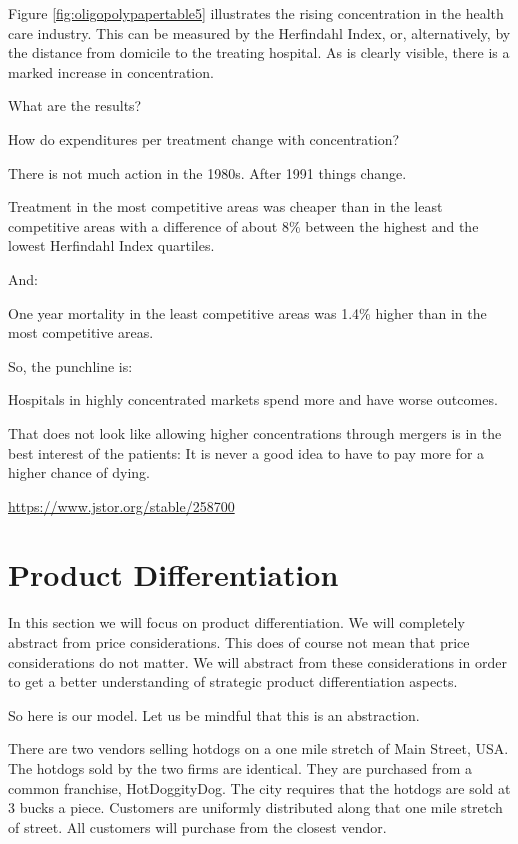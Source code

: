 \documentclass[
]{book}
\begin{document}
Figure \ref{fig:oligopolypapertable5} illustrates the rising concentration in the health care industry. This can be measured by the Herfindahl Index, or, alternatively, by the distance from domicile to the treating hospital. As is clearly visible, there is a marked increase in concentration.

What are the results?

How do expenditures per treatment change with concentration?

There is not much action in the 1980s. After 1991 things change.

Treatment in the most competitive areas was cheaper than in the least competitive areas with a difference of about 8\% between the highest and the lowest Herfindahl Index quartiles.

And:

One year mortality in the least competitive areas was 1.4\% higher than in the most competitive areas.

So, the punchline is:

Hospitals in highly concentrated markets spend more and have worse outcomes.

That does not look like allowing higher concentrations through mergers is in the best interest of the patients: It is never a good idea to have to pay more for a higher chance of dying.

\url{https://www.jstor.org/stable/258700}

\hypertarget{product-differentiation}{%
\section{Product Differentiation}\label{product-differentiation}}

In this section we will focus on product differentiation. We will completely abstract from price considerations. This does of course not mean that price considerations do not matter. We will abstract from these considerations in order to get a better understanding of strategic product differentiation aspects.

So here is our model. Let us be mindful that this is an abstraction.

There are two vendors selling hotdogs on a one mile stretch of Main Street, USA. The hotdogs sold by the two firms are identical. They are purchased from a common franchise, HotDoggityDog. The city requires that the hotdogs are sold at 3 bucks a piece. Customers are uniformly distributed along that one mile stretch of street. All customers will purchase from the closest vendor.
\end{document}

